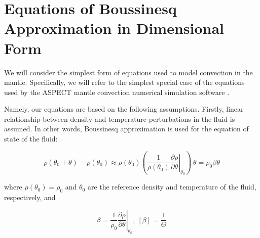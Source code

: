 \providecommand{\partialTimeTemp}{\partial_t\theta}
\providecommand{\inertTermTemp}{\velocity\cdot\nabla\theta}
\providecommand{\tempGrad}{\nabla \theta}
\providecommand{\laplacianTemp}{\Delta\theta}


\providecommand{\divergenceNondim}{\nabla^{\prime}\cdot}

\providecommand{\velocityNondim}{\mathbf{v^{\prime}}}

\providecommand{\substDerivVelNondim}{\frac{D\velocity^{\prime}}{dt^{\prime}}}
\providecommand{\partialTimeVelNondim}{\partial_{t^{\prime}}\velocity^{\prime}}
\providecommand{\inertTermVelNondim}{(\velocity^{\prime}\nabla^{\prime})\velocity^{\prime}}

\providecommand{\velocityPressureTensorNondim}{\partial_k^{\prime}v^{l \prime}\partial_k^{\prime}v^{l \prime}}

\providecommand{\pressGradNondim}{\nabla^{\prime} p^{\prime}}
\providecommand{\pressLaplacianNondim}{\Delta^{\prime} p^{\prime}}
\providecommand{\laplacianVelNondim}{\Delta^{\prime}\velocity^{\prime}}

\section{Equations of Boussinesq Approximation in Dimensional Form} \label{parameters}

We will consider the simplest form of equations used to model convection in the mantle. Specifically, we will refer to the simplest special case of the equations used by the ASPECT mantle convection numerical simulation software \cite[p. 13]{aspect}. 

Namely, our equations are based on the following assumptions. Firstly, linear relationship between density and temperature perturbations in the fluid is assumed. In other words, Boussinesq approximation is used for the equation of state of the fluid: 

\begin{equation} \label{density}
\rho(\theta_0 + \theta) - \rho(\theta_0) \approx \rho(\theta_0) (\left. \frac{1}{\rho(\theta_0)}\frac{\partial \rho}{\partial \theta} \right|_{\theta_0}) ~\theta = \rho_0 \beta\theta
\end{equation}

where $\rho(\theta_0) = \rho_0$ and $\theta_0$ are the reference density and temperature of the fluid, respectively, and

$$ \beta = \left. \frac{1}{\rho_0}\frac{\partial \rho}{\partial \theta} \right|_{\theta_0}, ~ [\beta] = \frac{1}{\Theta}$$

